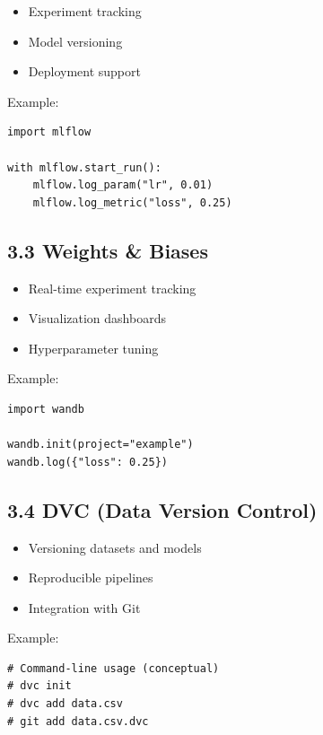 \begin{itemize}
\item Experiment tracking
\item Model versioning
\item Deployment support
\end{itemize}

Example:

\begin{verbatim}
import mlflow

with mlflow.start_run():
    mlflow.log_param("lr", 0.01)
    mlflow.log_metric("loss", 0.25)
\end{verbatim}

\subsection*{3.3 Weights \& Biases}

\begin{itemize}
\item Real-time experiment tracking
\item Visualization dashboards
\item Hyperparameter tuning
\end{itemize}

Example:

\begin{verbatim}
import wandb

wandb.init(project="example")
wandb.log({"loss": 0.25})
\end{verbatim}

\subsection*{3.4 DVC (Data Version Control)}

\begin{itemize}
\item Versioning datasets and models
\item Reproducible pipelines
\item Integration with Git
\end{itemize}

Example:

\begin{verbatim}
# Command-line usage (conceptual)
# dvc init
# dvc add data.csv
# git add data.csv.dvc
\end{verbatim}

\vspace{0.5cm}

